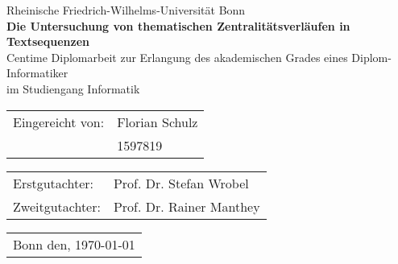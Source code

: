 \begin{titlepage}
\begin{center}
\vfill{Rheinische Friedrich-Wilhelms-Universität Bonn \\ \huge \textbf{Die Untersuchung von thematischen Zentralitätsverläufen in Textsequenzen} \\ \vspace{12pt}\Large Centime}
\vfill{Diplomarbeit zur Erlangung des akademischen Grades eines Diplom-Informatiker \\ im Studiengang Informatik}
\end{center}

\vfill {
\begin{tabular}{ll}
Eingereicht von: & Florian Schulz \\
				 & 1597819 \\
\end{tabular}
}

\vfill {
\begin{tabular}{ll}
Erstgutachter: & Prof. Dr. Stefan Wrobel \\
Zweitgutachter: & Prof. Dr. Rainer Manthey \\
\end{tabular}
}
\vfill{
\begin{tabular}{l}
Bonn den, \today \\
\end{tabular}
}
\end{titlepage}

\cleardoublepage

